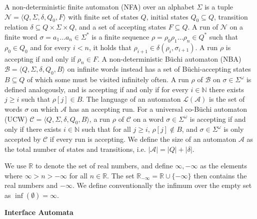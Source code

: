 A non-deterministic finite automaton (NFA) over an alphabet $\Sigma$ is a tuple $\mathcal{N}=\langle Q,\Sigma,\delta,Q_{0},F\rangle$ with finite set of states $Q$, initial states $Q_{0}\subseteq Q$, transition relation $\delta\subseteq Q\times\Sigma\times Q$, and a set of accepting states $F\subseteq Q$. A run of $\mathcal{N}$ on a finite word $\sigma=a_{1}\ldots a_{n}\in\Sigma^{*}$ is a finite sequence $\rho=\rho_{0}\rho_{1}\ldots\rho_{n}\in Q^{*}$ such that $\rho_{0}\in Q_{0}$ and for every $i<n$, it holds that $\rho_{i+1}\in\delta(\rho_{i},\sigma_{i+1})$. A run $\rho$ is accepting if and only if $\rho_{n}\in F$. A non-deterministic Büchi automaton (NBA) $\mathcal{B}=\langle Q,\Sigma,\delta,Q_{0},B\rangle$ on infinite words instead has a set of Büchi-accepting states $B\subseteq Q$ of which some must be visited infinitely often. A run $\rho$ of $\mathcal{B}$ on $\sigma\in\Sigma^{\omega}$ is defined analogously, and is accepting if and only if for every $i\in\mathbb{N}$ there exists $j\geq i$ such that $\rho[j]\in B$. The language of an automaton $\mathcal{L}(\mathcal{A})$ is the set of words $\sigma$ on which $\mathcal{A}$ has an accepting run. For a universal co-Büchi automaton (UCW) $\mathcal{C}=\langle Q,\Sigma,\delta,Q_{0},B\rangle$, a run $\rho$ of $\mathcal{C}$ on a word $\sigma\in\Sigma^{\omega}$ is accepting if and only if there exists $i\in\mathbb{N}$ such that for all $j\geq i$, $\rho[j]\not\in B$, and $\sigma\in\Sigma^{\omega}$ is only accepted by $\mathcal{C}$ if every run is accepting. We define the size of an automaton $\mathcal{A}$ as the total number of states and transitions, i.e. $|\mathcal{A}|=|Q|+|\delta|$.\par
 
 
 
We use $\mathbb{R}$ to denote the set of real numbers, and define $\infty,-\infty$ as the elements where $\infty>n>-\infty$ for all $n\in\mathbb{R}$. The set $\mathbb{R}_{-\infty}=\mathbb{R}\cup\{-\infty\}$ then contains the real numbers and $-\infty$. We define conventionally the infimum over the empty set as $\inf(\emptyset)=\infty$.\par
 
 
 
 
\par\medskip\noindent\textbf{Interface Automata}\par
 
